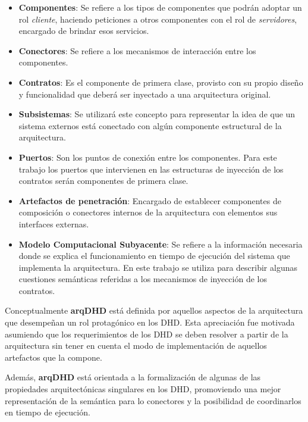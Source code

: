 \begin{itemize}
 
 \item \textbf{Componentes}: Se refiere a los tipos de componentes que podrán adoptar un rol 
 \textit{cliente}, haciendo peticiones a otros componentes con el rol de \textit{servidores}, encargado de brindar esos servicios. \label{lbl:componente} 
 
 
 \item \textbf{Conectores}: Se refiere a los mecanismos de interacción entre los componentes.
 
 \item \textbf{Contratos}: Es el componente de primera clase, provisto con su propio diseño y funcionalidad que deberá ser inyectado a una arquitectura original.
 
 \item \textbf{Subsistemas}: Se utilizará este concepto para representar la idea de que un sistema externos está conectado con algún componente estructural de la arquitectura. 
 
 \item \textbf{Puertos}:  Son los puntos de conexión entre los componentes. Para este trabajo los puertos que intervienen en las estructuras de inyección de los contratos serán componentes de primera clase.
  
 \item \textbf{Artefactos de penetración}: Encargado de establecer componentes de
composición  o conectores internos de la arquitectura con elementos sus
interfaces externas. 

 \item \textbf{Modelo Computacional Subyacente}: Se refiere a la información necesaria donde se explica el funcionamiento en tiempo de ejecución del sistema que implementa la arquitectura. En este trabajo se utiliza para describir algunas cuestiones semánticas referidas a los mecanismos de inyección de los contratos.


\end{itemize}

Conceptualmente \textbf{arqDHD} está definida por aquellos aspectos de la arquitectura que desempeñan un rol protagónico en los DHD. Esta apreciación fue motivada asumiendo que los
requerimientos de los DHD se deben resolver a partir de la arquitectura sin
tener en cuenta el modo de implementación de aquellos artefactos que la compone.

Además, \textbf{arqDHD} está orientada a la formalización de algunas de las propiedades
arquitectónicas singulares en los DHD, promoviendo una mejor representación de
la semántica para lo conectores y la posibilidad de coordinarlos en tiempo de ejecución.


